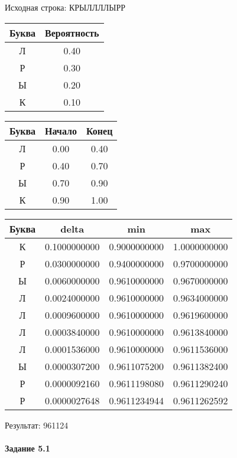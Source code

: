 \documentclass[a4paper, 12pt]{article}
\begin{document}
Исходная строка: КРЫЛЛЛЛЫРР\
\begin{center}
 \begin{tabular}{ |c|c| } 
  \hline
     Буква & Вероятность \\ \hline
Л & 0.40\\\hline
Р & 0.30\\\hline
Ы & 0.20\\\hline
К & 0.10
\\ \hline \end{tabular}
\end{center}
\begin{center}
 \begin{tabular}{ |c|c|c| } 
  \hline
     Буква & Начало & Конец \\ \hline
Л & 0.00 & 0.40\\\hline
Р & 0.40 & 0.70\\\hline
Ы & 0.70 & 0.90\\\hline
К & 0.90 & 1.00
\\ \hline \end{tabular}
\end{center}
\begin{center}
 \begin{tabular}{ |c|c|c|c| } 
  \hline
     Буква & delta & min & max \\ \hline
К & 0.1000000000 & 0.9000000000 & 1.0000000000\\\hline
Р & 0.0300000000 & 0.9400000000 & 0.9700000000\\\hline
Ы & 0.0060000000 & 0.9610000000 & 0.9670000000\\\hline
Л & 0.0024000000 & 0.9610000000 & 0.9634000000\\\hline
Л & 0.0009600000 & 0.9610000000 & 0.9619600000\\\hline
Л & 0.0003840000 & 0.9610000000 & 0.9613840000\\\hline
Л & 0.0001536000 & 0.9610000000 & 0.9611536000\\\hline
Ы & 0.0000307200 & 0.9611075200 & 0.9611382400\\\hline
Р & 0.0000092160 & 0.9611198080 & 0.9611290240\\\hline
Р & 0.0000027648 & 0.9611234944 & 0.9611262592
\\ \hline \end{tabular}
\end{center}
Результат: 961124
\pagebreak
\paragraph{Задание 5.1 \\
}
\end{document}
